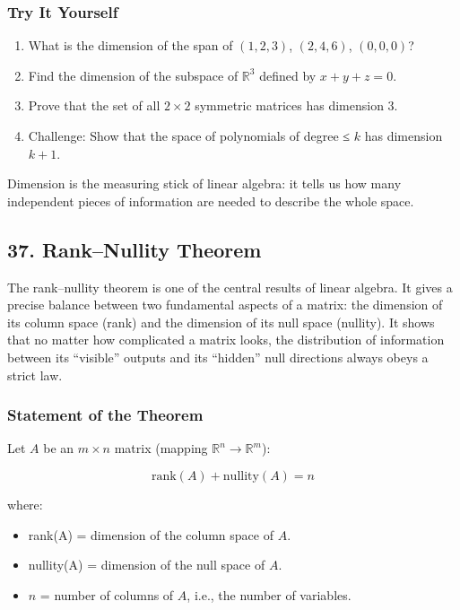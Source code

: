 \documentclass[
  letterpaper,
  DIV=11,
  numbers=noendperiod]{scrreprt}
\providecommand{\tightlist}{%
  \setlength{\itemsep}{0pt}\setlength{\parskip}{0pt}}
\begin{document}
\subsubsection{Try It Yourself}\label{try-it-yourself-35}

\begin{enumerate}
\def\labelenumi{\arabic{enumi}.}
\tightlist
\item
  What is the dimension of the span of \((1,2,3)\), \((2,4,6)\),
  \((0,0,0)\)?
\item
  Find the dimension of the subspace of \(\mathbb{R}^3\) defined by
  \(x+y+z=0\).
\item
  Prove that the set of all \(2 \times 2\) symmetric matrices has
  dimension 3.
\item
  Challenge: Show that the space of polynomials of degree ≤ \(k\) has
  dimension \(k+1\).
\end{enumerate}

Dimension is the measuring stick of linear algebra: it tells us how many
independent pieces of information are needed to describe the whole
space.

\subsection{37. Rank--Nullity Theorem}\label{ranknullity-theorem}

The rank--nullity theorem is one of the central results of linear
algebra. It gives a precise balance between two fundamental aspects of a
matrix: the dimension of its column space (rank) and the dimension of
its null space (nullity). It shows that no matter how complicated a
matrix looks, the distribution of information between its ``visible''
outputs and its ``hidden'' null directions always obeys a strict law.

\subsubsection{Statement of the Theorem}\label{statement-of-the-theorem}

Let \(A\) be an \(m \times n\) matrix (mapping
\(\mathbb{R}^n \to \mathbb{R}^m\)):

\[
\text{rank}(A) + \text{nullity}(A) = n
\]

where:

\begin{itemize}
\tightlist
\item
  rank(A) = dimension of the column space of \(A\).
\item
  nullity(A) = dimension of the null space of \(A\).
\item
  \(n\) = number of columns of \(A\), i.e., the number of variables.
\end{itemize}
\end{document}
